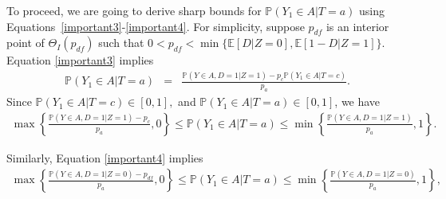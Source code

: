 \documentclass[12pt]{article}
\theoremstyle{plain}
\theoremstyle{definition}
\theoremstyle{remark}
\begin{document}
To proceed, we are going to derive sharp bounds for $\mathbb P(Y_1 \in A \vert T=a)$ using Equations~\eqref{important3}-\eqref{important4}. 
For simplicity, suppose $p_{df}$ is an interior point of $\Theta_I(p_{df})$ such that $0 < p_{df} < \min\{\mathbb E[D\vert Z=0], \mathbb E[1-D \vert Z=1]\}$.
Equation \eqref{important3} implies 
\begin{eqnarray*}
    \mathbb P(Y_1 \in A \vert T=a) &=& \frac{\mathbb P(Y\in A, D=1 \vert Z=1)- p_c \mathbb P(Y_1 \in A \vert T=c)}{p_a}.
\end{eqnarray*}
Since $\mathbb P(Y_1 \in A \vert T=c) \in [0,1],$ and $\mathbb P(Y_1 \in A \vert T=a) \in [0,1]$, we have
\begin{eqnarray*}
   \max\left\{\frac{\mathbb P(Y\in A, D=1 \vert Z=1)- p_c}{p_a},0\right\} \leq \mathbb P(Y_1 \in A \vert T=a) \leq \min\left\{\frac{\mathbb P(Y\in A, D=1 \vert Z=1)}{p_a},1\right\}.%
   \end{eqnarray*}

   
Similarly, Equation \eqref{important4} implies
\begin{eqnarray*}
   \max\left\{\frac{\mathbb P(Y\in A, D=1 \vert Z=0)- p_{df}}{p_a},0\right\} \leq \mathbb P(Y_1 \in A \vert T=a) \leq \min\left\{\frac{\mathbb P(Y\in A, D=1 \vert Z=0)}{p_a},1\right\},   
   \end{eqnarray*}
   
\end{document}
